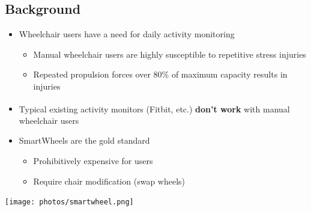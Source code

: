 \documentclass[a0,landscape]{a0poster}
\newenvironment{Figure}
  {\par\medskip\noindent\minipage{\linewidth}}
  {\endminipage\par\medskip}
\begin{document}
\vspace{3cm}

\begin{multicols*}{3}
\large

\section*{Background}
\begin{minipage}[t]{0.55\columnwidth}
    \begin{itemize}
        \item Wheelchair users have a need for daily activity monitoring
            \begin{itemize}
                \item Manual wheelchair users are highly susceptible to repetitive stress injuries \cite{mercer06}
                \item Repeated propulsion forces over 80\% of maximum capacity results in injuries \cite{hills11}
            \end{itemize}
        \item Typical existing activity monitors (Fitbit\textsuperscript{\textregistered}, etc.) \textbf{don't work} with manual wheelchair users
        \item SmartWheels are the gold standard \cite{asato93,cowan08}
            \begin{itemize}
                \item Prohibitively expensive for users
                \item Require chair modification (swap wheels)
            \end{itemize}
    \end{itemize}
\end{minipage}
\hspace{0.05\columnwidth}%
\begin{minipage}[t]{0.4\columnwidth}
    \begin{Figure}
        \centering
        \texttt{[image: photos/smartwheel.png]}
        \label{fig:smartwheel}
    \end{Figure}
\end{minipage}


\end{multicols*}
\end{document}
